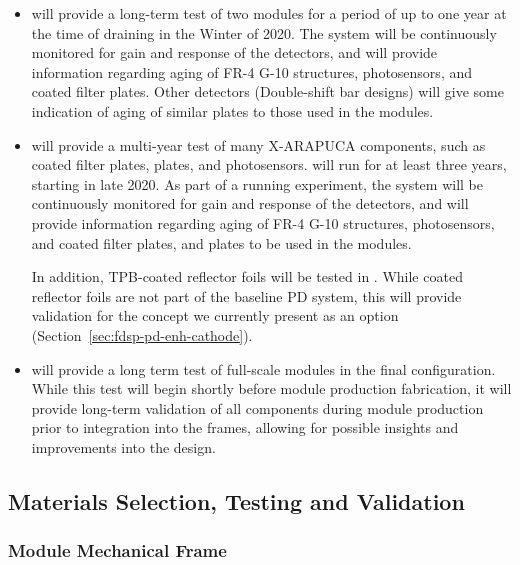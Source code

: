 \begin{itemize}

    \item {} will provide a long-term test of two  modules for a period of up to one year at the time of draining in the Winter of 2020.  The system will be continuously monitored for gain and response of the detectors, and will provide information regarding aging of FR-4 G-10 structures, photosensors, and coated filter plates.  Other  detectors (Double-shift bar designs) will give some indication of aging of similar  plates to those used in the  modules.

    \item {} will provide a multi-year test of many X-ARAPUCA components, such as coated filter plates,  plates, and photosensors.   will run for at least three years, starting in late 2020.  As part of a running experiment, the system will be continuously monitored for gain and response of the detectors, and will provide information regarding aging of FR-4 G-10 structures, photosensors, and coated filter plates, and  plates to be used in the  modules.
    
    In addition, TPB-coated reflector foils will be tested in . While coated reflector foils are not part of the baseline PD system, this will provide validation for the concept we currently present as an option (Section~\ref{sec:fdsp-pd-enh-cathode}).
    
    \item {} will provide a long term test of full-scale  modules in the final  configuration. While this test will begin shortly before   module production fabrication, it will provide long-term validation of all  components during module production prior to integration into the  frames, allowing for possible insights and improvements into the  design.

\end{itemize}


\subsection{Materials Selection, Testing and Validation}

\subsubsection{ Module Mechanical Frame}

